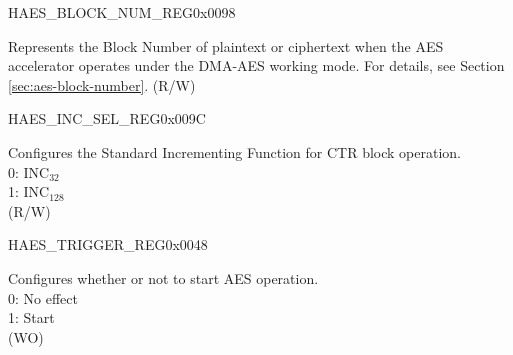 \begin{register}{H}{AES\_BLOCK\_NUM\_REG}{0x0098}\label{regdesc:AESBLOCKNUMREG}
%
\regnewline%
\begin{regdesc}\begin{reglist}
\item [AES\_BLOCK\_NUM] Represents the Block Number of plaintext or ciphertext when the AES accelerator operates under the DMA-AES working mode. For details, see Section \ref{sec:aes-block-number}. (R/W)
\end{reglist}\end{regdesc}
\end{register}


\begin{register}{H}{AES\_INC\_SEL\_REG}{0x009C}\label{regdesc:AESINCSELREG}
%
%
\regnewline%
\begin{regdesc}\begin{reglist}
\item [AES\_INC\_SEL] Configures the Standard Incrementing Function for CTR block operation. \\
0: INC$_{32}$\\
1: INC$_{128}$\\
(R/W)
\end{reglist}\end{regdesc}
\end{register}


\begin{register}{H}{AES\_TRIGGER\_REG}{0x0048}\label{regdesc:AESTRIGGERREG}
%
%
\regnewline%
\begin{regdesc}\begin{reglist}
\item [AES\_TRIGGER] Configures whether or not to start AES operation. \\
0: No effect\\
1: Start\\
(WO)
\end{reglist}\end{regdesc}
\end{register}


